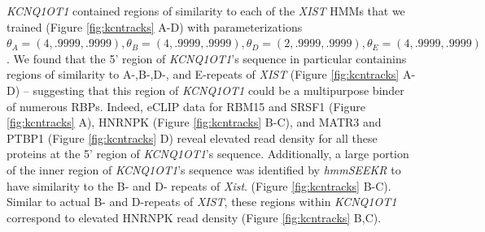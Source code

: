 \emph{KCNQ1OT1} contained regions of similarity to each of the \emph{XIST} HMMs that we trained (Figure \ref{fig:kcntracks} A-D) with parameterizations $\theta_A = (4,.9999,.9999), \theta_B = (4,.9999,.9999), \theta_D = (2,.9999,.9999), \theta_E = (4,.9999,.9999)$. We found that the 5' region of \emph{KCNQ1OT1}'s sequence in particular containins regions of similarity to A-,B-,D-, and E-repeats of \emph{XIST} (Figure \ref{fig:kcntracks} A-D) -- suggesting that this region of \emph{KCNQ1OT1} could be a multipurpose binder of numerous RBPs. Indeed, eCLIP data for RBM15 and SRSF1 (Figure \ref{fig:kcntracks} A), HNRNPK (Figure \ref{fig:kcntracks} B-C), and MATR3 and PTBP1 (Figure \ref{fig:kcntracks} D) reveal elevated read density for all these proteins at the 5' region of \emph{KCNQ1OT1}'s sequence. Additionally, a large portion of the inner region of \emph{KCNQ1OT1}'s sequence was identified by \emph{hmmSEEKR} to have similarity to the B- and D- repeats of \emph{Xist}. (Figure \ref{fig:kcntracks} B-C). Similar to actual B- and D-repeats of \emph{XIST}, these regions within \emph{KCNQ1OT1} correspond to elevated HNRNPK read density (Figure \ref{fig:kcntracks} B,C). 
